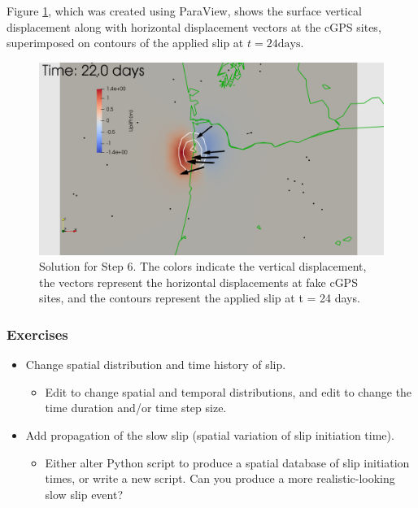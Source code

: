 Figure \ref{fig:example:subduction:3d:step06}, which was created
using ParaView, shows the surface vertical displacement along with
horizontal displacement vectors at the cGPS sites, superimposed on
contours of the applied slip at $t = 24 \mathrm{days}$.

\begin{figure}
  \includegraphics[width=4.5in]{examples/figs/subduction3d_step06_soln}
  \caption{Solution for Step 6. The colors indicate the vertical
    displacement, the vectors represent the horizontal displacements
    at fake cGPS sites, and the contours represent the applied
    slip at t = 24 days.}
  \label{fig:example:subduction:3d:step06}
\end{figure}


\subsubsection{Exercises}

\begin{itemize}
\item Change spatial distribution and time history of slip.
  \begin{itemize}
  \item Edit  to change spatial and
    temporal distributions, and edit  to change the
    time duration and/or time step size.
  \end{itemize}
\item Add propagation of the slow slip (spatial variation of slip
  initiation time).
  \begin{itemize}
  \item Either alter Python script to produce a spatial database of
    slip initiation times, or write a new script. Can you produce a
    more realistic-looking slow slip event?
  \end{itemize}
\end{itemize}

